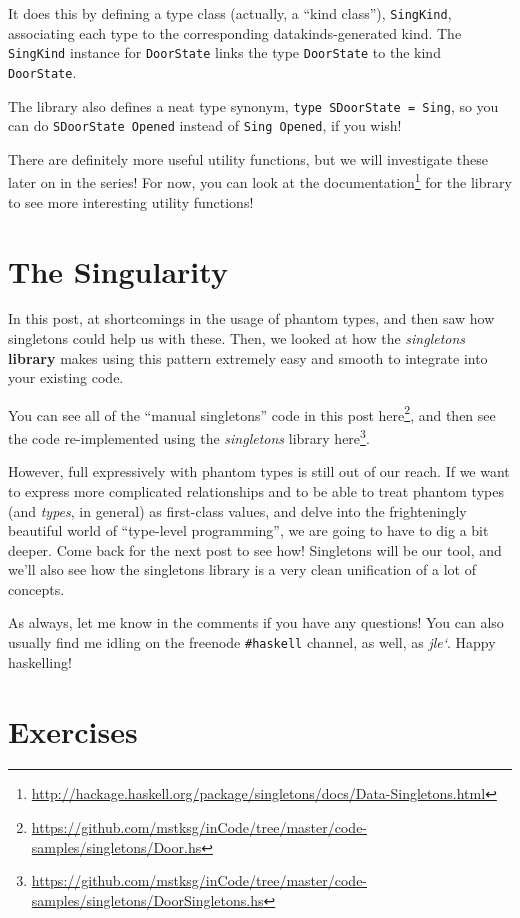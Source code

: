 \documentclass[]{article}
\renewcommand{\href}[2]{#2\footnote{\url{#1}}}
\begin{document}
It does this by defining a type class (actually, a ``kind class''),
\texttt{SingKind}, associating each type to the corresponding
datakinds-generated kind. The \texttt{SingKind} instance for \texttt{DoorState}
links the type \texttt{DoorState} to the kind \texttt{DoorState}.

The library also defines a neat type synonym,
\texttt{type\ SDoorState\ =\ Sing}, so you can do
\texttt{SDoorState\ \textquotesingle{}Opened} instead of
\texttt{Sing\ \textquotesingle{}Opened}, if you wish!

There are definitely more useful utility functions, but we will investigate
these later on in the series! For now, you can look at the
\href{http://hackage.haskell.org/package/singletons/docs/Data-Singletons.html}{documentation}
for the library to see more interesting utility functions!

\section{The Singularity}\label{the-singularity}

In this post, at shortcomings in the usage of phantom types, and then saw how
singletons could help us with these. Then, we looked at how the
\emph{singletons} \textbf{library} makes using this pattern extremely easy and
smooth to integrate into your existing code.

You can see all of the ``manual singletons'' code in this post
\href{https://github.com/mstksg/inCode/tree/master/code-samples/singletons/Door.hs}{here},
and then see the code re-implemented using the \emph{singletons} library
\href{https://github.com/mstksg/inCode/tree/master/code-samples/singletons/DoorSingletons.hs}{here}.

However, full expressively with phantom types is still out of our reach. If we
want to express more complicated relationships and to be able to treat phantom
types (and \emph{types}, in general) as first-class values, and delve into the
frighteningly beautiful world of ``type-level programming'', we are going to
have to dig a bit deeper. Come back for the next post to see how! Singletons
will be our tool, and we'll also see how the singletons library is a very clean
unification of a lot of concepts.

As always, let me know in the comments if you have any questions! You can also
usually find me idling on the freenode \texttt{\#haskell} channel, as well, as
\emph{jle`}. Happy haskelling!

\section{Exercises}\label{exercises}
\end{document}
